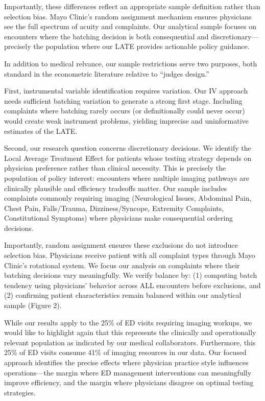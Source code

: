 \documentclass[11pt]{article}
\newcommand{\1}{\hbox{\rm 1\kern-.35em 1}}
\begin{document}
Importantly, these differences reflect an appropriate sample definition rather than selection bias. Mayo Clinic's random assignment mechanism ensures physicians see the full spectrum of acuity and complaints. Our analytical sample focuses on encounters where the batching decision is both consequential and discretionary---precisely the population where our LATE provides actionable policy guidance.

In addition to medical relvance, our sample restrictions serve two purposes, both standard in the econometric literature relative to ``judges design.''

First, instrumental variable identification requires variation. Our IV approach needs sufficient batching variation to generate a strong first stage. Including complaints where batching rarely occurs (or definitionally could never occur) would create weak instrument problems, yielding imprecise and uninformative estimates of the LATE. 

Second, our research question concerns discretionary decisions. We identify the Local Average Treatment Effect for patients whose testing strategy depends on physician preference rather than clinical necessity. This is precisely the population of policy interest: encounters where multiple imaging pathways are clinically plausible and efficiency tradeoffs matter. Our sample includes complaints commonly requiring imaging (Neurological Issues, Abdominal Pain, Chest Pain, Falls/Trauma, Dizziness/Syncope, Extremity Complaints, Constitutional Symptoms) where physicians make consequential ordering decisions.

Importantly, random assignment ensures these exclusions do not introduce selection bias. Physicians receive patient with all complaint types through Mayo Clinic's rotational system. We focus our analysis on complaints where their batching decisions vary meaningfully. We verify balance by: (1) computing batch tendency using physicians' behavior across ALL encounters before exclusions, and (2) confirming patient characteristics remain balanced within our analytical sample (Figure 2).

While our results apply to the 25\% of ED visits requiring imaging workups, we would like to highlight again that this represents the clinically and operationally relevant population as indicated by our medical collaborators. Furthermore, this 25\% of ED visits consume 41\% of imaging resources in our data. Our focused approach identifies the precise effects where physician practice style influences operations---the margin where ED management interventions can meaningfully improve efficiency, and the margin where physicians disagree on optimal testing strategies.
\end{document}
